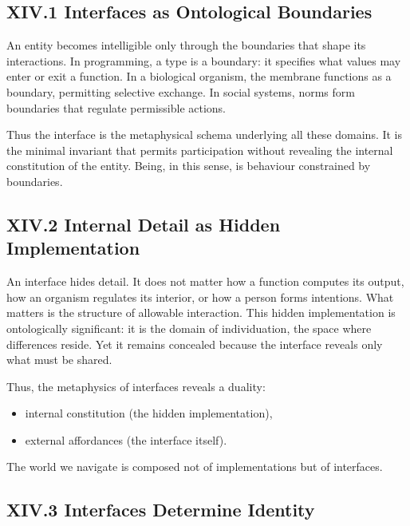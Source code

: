 \documentclass[11pt,letterpaper]{article}
\begin{document}
\subsection{XIV.1 Interfaces as Ontological Boundaries}

An entity becomes intelligible only through the boundaries that shape its interactions. In programming, a type is a boundary: it specifies what values may enter or exit a function. In a biological organism, the membrane functions as a boundary, permitting selective exchange. In social systems, norms form boundaries that regulate permissible actions.

Thus the interface is the metaphysical schema underlying all these domains. It is the minimal invariant that permits participation without revealing the internal constitution of the entity. Being, in this sense, is behaviour constrained by boundaries.

\subsection{XIV.2 Internal Detail as Hidden Implementation}

An interface hides detail. It does not matter how a function computes its output, how an organism regulates its interior, or how a person forms intentions. What matters is the structure of allowable interaction. This hidden implementation is ontologically significant: it is the domain of individuation, the space where differences reside. Yet it remains concealed because the interface reveals only what must be shared.

Thus, the metaphysics of interfaces reveals a duality:

\begin{itemize}
    \item internal constitution (the hidden implementation),
    \item external affordances (the interface itself).
\end{itemize}

The world we navigate is composed not of implementations but of interfaces.

\subsection{XIV.3 Interfaces Determine Identity}
\end{document}
